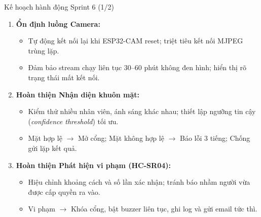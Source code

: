 \documentclass[aspectratio=169]{beamer}
\begin{document}
\begin{frame}{Kế hoạch hành động Sprint 6 (1/2)}
  \begin{enumerate}
    \item \textbf{Ổn định luồng Camera:}
      \begin{itemize}
        \item Tự động kết nối lại khi ESP32-CAM reset; triệt tiêu kết nối MJPEG trùng lặp.
        \item Đảm bảo stream chạy liên tục 30--60 phút không đen hình; hiển thị rõ trạng thái mất kết nối.
      \end{itemize}
    \vspace{0.3em}
    \item \textbf{Hoàn thiện Nhận diện khuôn mặt:}
      \begin{itemize}
        \item Kiểm thử nhiều nhân viên, ánh sáng khác nhau; thiết lập ngưỡng tin cậy (\textit{confidence threshold}) tối ưu.
        \item Mặt hợp lệ $\rightarrow$ Mở cổng; Mặt không hợp lệ $\rightarrow$ Báo lỗi 3 tiếng; Chống gửi lặp kết quả.
      \end{itemize}
    \vspace{0.3em}
    \item \textbf{Hoàn thiện Phát hiện vi phạm (HC-SR04):}
      \begin{itemize}
        \item Hiệu chỉnh khoảng cách và số lần xác nhận; tránh báo nhầm người vừa được cấp quyền ra vào.
        \item Vi phạm $\rightarrow$ Khóa cổng, bật buzzer liên tục, ghi log và gửi email tức thì.
      \end{itemize}
  \end{enumerate}
\end{frame}
\end{document}
